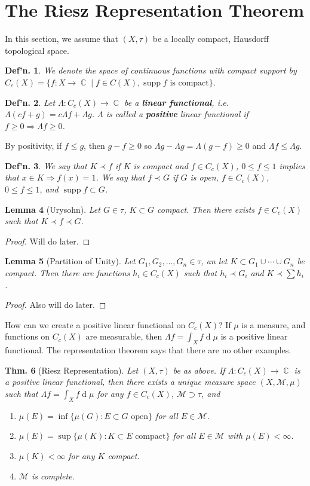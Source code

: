 \documentclass[12pt, a4paper]{book}
\DeclareMathOperator{\C}{\mathbb{C}}
\DeclareMathOperator{\supp}{supp}
\renewcommand{\d}[1]{\ensuremath{\operatorname{d}\!{#1}}} %
\newtheorem{theorem}{Thm.}[section]
\newtheorem{lemma}[theorem]{Lemma}
\newtheorem{definition}[theorem]{Def'n.}
\theoremstyle{nonumberplain}
\newtheorem{proof}{Proof}
\begin{document}
\section{The Riesz Representation Theorem}
In this section, we assume that $(X,\tau)$ be a locally compact, Hausdorff topological space.
\begin{definition}
    We denote the space of continuous functions with compact support by $C_c(X)=\{f:X\to\C\mid f\in C(X),\supp f\text{ is compact}\}$.
\end{definition}
\begin{definition}
    Let $\Lambda:C_c(X)\to\C$ be a \textbf{linear functional}, i.e. $\Lambda(cf+g)=c\Lambda f+\Lambda g$.
    $\Lambda$ is called a \textbf{positive} linear functional if $f\geq 0\Rightarrow\Lambda f\geq 0$.
\end{definition}
By positivity, if $f\leq g$, then $g-f\geq 0$ so $\Lambda g-\Lambda g=\Lambda(g-f)\geq 0$ and $\Lambda f\leq\Lambda g$.
\begin{definition}
    We say that $K\prec f$ if $K$ is compact and $f\in C_c(X)$, $0\leq f\leq 1$ implies that $x\in K\Rightarrow f(x)=1$.
    We say that $f\prec G$ if $G$ is open, $f\in C_c(X)$, $0\leq f\leq 1$, and $\supp f\subset G$.
\end{definition}
\begin{lemma}[Urysohn]
    Let $G\in\tau$, $K\subset G$ compact.
    Then there exists $f\in C_c(X)$ such that $K\prec f\prec G$.
\end{lemma}
\begin{proof}
    Will do later.
\end{proof}
\begin{lemma}[Partition of Unity]
    Let $G_1,G_2,\ldots,G_n\in\tau$, an let $K\subset G_1\cup\cdots\cup G_n$ be compact.
    Then there are functions $h_i\in C_c(X)$ such that $h_i\prec G_i$ and $K\prec \sum h_i$.
\end{lemma}
\begin{proof}
    Also will do later.
\end{proof}
How can we create a positive linear functional on $C_c(X)$?
If $\mu$ is a measure, and functions on $C_c(X)$ are measurable, then $\Lambda f=\int_X f\d{\mu}$ is a positive linear functional.
The representation theorem says that there are no other examples.
\begin{theorem}[Riesz Representation]
    Let $(X,\tau)$ be as above.
    If $\Lambda:C_c(X)\to\C$ is a positive linear functional, then there exists a unique measure space $(X,\mathcal{M},\mu)$ such that $\Lambda f=\int_Xf\d{\mu}$ for any $f\in C_c(X)$, $\mathcal{M}\supset\tau$, and
    \begin{enumerate}[label=(\roman*),nolistsep]
        \item $\mu(E)=\inf\{\mu(G):E\subset G\text{ open}\}$ for all $E\in\mathcal{M}$.
        \item $\mu(E)=\sup\{\mu(K):K\subset E\text{ compact}\}$ for all $E\in\mathcal{M}$ with $\mu(E)<\infty$.
        \item $\mu(K)<\infty$ for any $K$ compact.
        \item $\mathcal{M}$ is complete.
    \end{enumerate}
\end{theorem}
\end{document}
